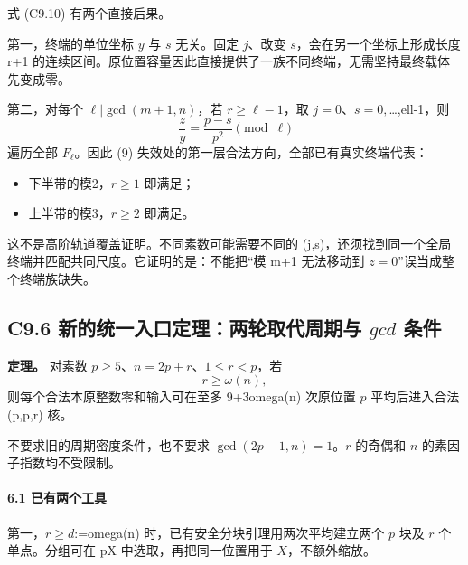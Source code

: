 \documentclass[11pt,a4paper]{article}
\newcommand{\tightlist}{\setlength{\itemsep}{0pt}\setlength{\parskip}{0pt}}
\theoremstyle{definition}
\numberwithin{equation}{section}
\begin{document}
{式} {(C9.10)} {有两个直接后果。}

{第一，终端的单位坐标} {\ensuremath{y}} {与} {\ensuremath{s}} {无关。固定} {\ensuremath{j}、改变} {\ensuremath{s}，会在另一个坐标上形成长度} {r+1} {的连续区间。原位置容量因此直接提供了一族不同终端，无需坚持最终载体先变成零。}

{第二，对每个} {\ensuremath{\ell |\operatorname{gcd}(m+1,n)}，若} {\ensuremath{r\ge \ell -1}，取} {\ensuremath{j=0}、\ensuremath{s=0,}\ldots,ell-1，则} \[
\frac zy=\frac{p-s}{p^2}\pmod\ell
\] {遍历全部} {\ensuremath{F_\ell }。因此} {(9)} {失效处的第一层合法方向，全部已有真实终端代表：}

\begin{itemize}
\tightlist
\item
  {下半带的模2，\ensuremath{r\ge 1}} {即满足；}
\item
  {上半带的模3，\ensuremath{r\ge 2}} {即满足。}
\end{itemize}

{这不是高阶轨道覆盖证明。不同素数可能需要不同的} {(j,s)，还须找到同一个全局终端并匹配共同尺度。它证明的是：不能把``模} {m+1} {无法移动到} {\ensuremath{z=0}''误当成整个终端族缺失。}

\subsection*{\texorpdfstring{{C9.6} {新的统一入口定理：两轮取代周期与} {\ensuremath{gcd}} {条件}}{C9.6 新的统一入口定理：两轮取代周期与  条件}}\label{C9-h65}

\textbf{{定理。}} {对素数} {\ensuremath{p\ge 5}、\ensuremath{n=2p+r}、\ensuremath{1\le r<p}，若} \[
\boxed{r\ge\omega(n),}
\tag{C9.13}
\] {则每个合法本原整数零和输入可在至多} {9+3omega(n)} {次原位置} {\ensuremath{p}} {平均后进入合法} {(p,p,r)} {核。}

{不要求旧的周期密度条件，也不要求} {\ensuremath{\operatorname{gcd}(2p-1,n)=1}。\ensuremath{r}} {的奇偶和} {\ensuremath{n}} {的素因子指数均不受限制。}

\paragraph*{\texorpdfstring{{6.1} {已有两个工具}}{6.1 已有两个工具}}\label{C9-h66}

{第一，\ensuremath{r\ge d}:=omega(n)} {时，已有安全分块引理用两次平均建立两个} {\ensuremath{p}} {块及} {\ensuremath{r}} {个单点。分组可在} {pX} {中选取，再把同一位置用于} {\ensuremath{X}，不额外缩放。}
\end{document}
